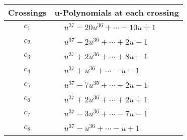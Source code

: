 \documentclass[1p]{elsarticle_modified}
\theoremstyle{definition}
\begin{document}
\begin{tabular}{m{50pt}|m{274pt}}
Crossings & \hspace{64pt}u-Polynomials at each crossing \\
\hline $$\begin{aligned}c_{1}\end{aligned}$$&$\begin{aligned}
&u^{37}-20 u^{36}+\cdots-10 u+1
\end{aligned}$\\
\hline $$\begin{aligned}c_{2}\end{aligned}$$&$\begin{aligned}
&u^{37}-2 u^{36}+\cdots+2 u-1
\end{aligned}$\\
\hline $$\begin{aligned}c_{3}\end{aligned}$$&$\begin{aligned}
&u^{37}+2 u^{36}+\cdots+8 u-1
\end{aligned}$\\
\hline $$\begin{aligned}c_{4}\end{aligned}$$&$\begin{aligned}
&u^{37}+u^{36}+\cdots- u-1
\end{aligned}$\\
\hline $$\begin{aligned}c_{5}\end{aligned}$$&$\begin{aligned}
&u^{37}-7 u^{35}+\cdots-2 u-1
\end{aligned}$\\
\hline $$\begin{aligned}c_{6}\end{aligned}$$&$\begin{aligned}
&u^{37}+2 u^{36}+\cdots+2 u+1
\end{aligned}$\\
\hline $$\begin{aligned}c_{7}\end{aligned}$$&$\begin{aligned}
&u^{37}-3 u^{36}+\cdots-7 u-1
\end{aligned}$\\
\hline $$\begin{aligned}c_{8}\end{aligned}$$&$\begin{aligned}
&u^{37}- u^{36}+\cdots- u+1
\end{aligned}$\\

\end{tabular}
\end{document}
